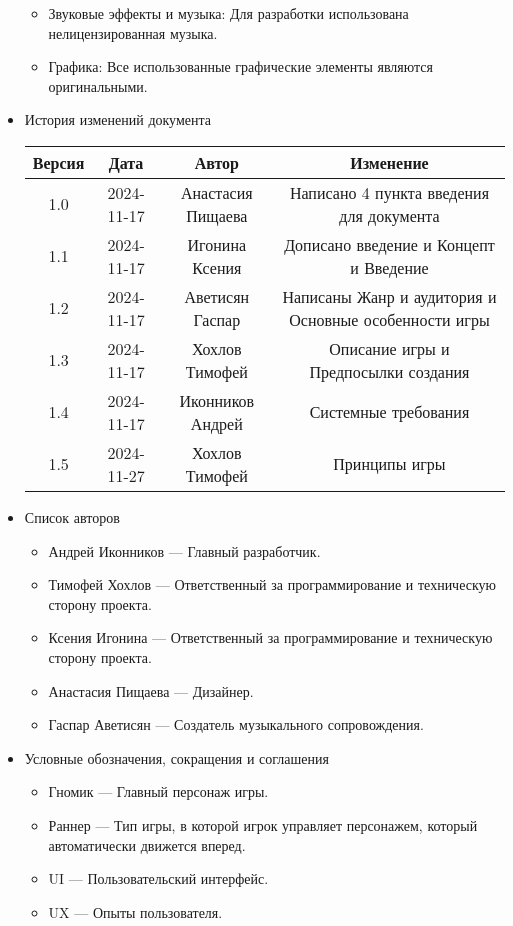 \documentclass{article}
\begin{document}
\begin{itemize}
\begin{itemize}
\item Звуковые эффекты и музыка: Для разработки использована нелицензированная музыка.

\item Графика: Все использованные графические элементы являются оригинальными.
\end{itemize}

\item История изменений документа
\begin{center}
\begin{tabular}{| c | c | c | c |}
\hline
 Версия & Дата & Автор & Изменение \\  \hline
 1.0 & 2024-11-17 & Анастасия Пищаева & Написано 4 пункта введения для документа\\ \hline
 1.1 & 2024-11-17 & Игонина Ксения & Дописано введение и Концепт и Введение\\  \hline 
 1.2 & 2024-11-17 & Аветисян Гаспар & Написаны Жанр и аудитория и Основные особенности игры\\  \hline
 1.3 & 2024-11-17 & Хохлов Тимофей & Описание игры и Предпосылки создания\\  \hline
 1.4 & 2024-11-17 & Иконников Андрей & Системные требования\\ \hline 
 1.5 & 2024-11-27 & Хохлов Тимофей & Принципы игры\\  \hline
\end{tabular}
\end{center}

\item Список авторов
	\begin{itemize}
		\item Андрей Иконников — Главный разработчик.
		\item Тимофей Хохлов — Ответственный за программирование и техническую сторону проекта.
		\item Ксения Игонина — Ответственный за программирование и техническую сторону проекта.
		\item Анастасия Пищаева — Дизайнер.
		\item Гаспар Аветисян — Создатель музыкального сопровождения.
	\end{itemize}

\item Условные обозначения, сокращения и соглашения
	\begin{itemize}
            \item Гномик — Главный персонаж игры.
            \item Раннер — Тип игры, в которой игрок управляет персонажем, который автоматически движется вперед.
            \item UI — Пользовательский интерфейс.
            \item UX — Опыты пользователя.
	\end{itemize}


\end{itemize}
\end{document}
